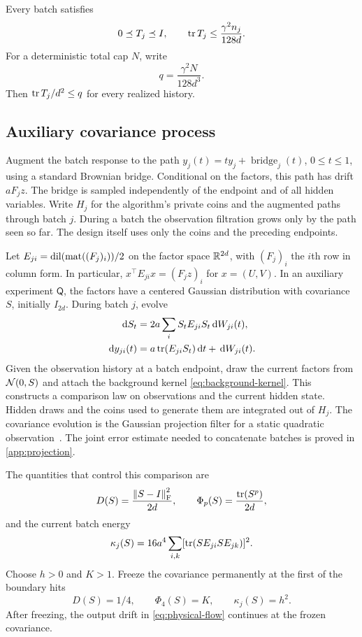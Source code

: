 Every batch satisfies
\begin{equation}
 0\preceq T_j\preceq I,\qquad
 \operatorname{tr} T_j\le\frac{\gamma^2n_j}{128d}.
 \label{eq:batch-energy}
\end{equation}
For a deterministic total cap $N$, write
\[
 q=\frac{\gamma^2N}{128d^3}.
\]
Then $\operatorname{tr} T_j/d^2\le q$ for every realized history.

\subsection{Auxiliary covariance process}

Augment the batch response to the path
$y_j(t)=t y_j+\operatorname{bridge}_j(t)$, $0\le t\le1$, using a standard Brownian bridge.
Conditional on the factors, this path has drift $aF_jz$.
The bridge is sampled independently of the endpoint and of all hidden variables. Write $H_j$ for the algorithm's private coins and the augmented paths through batch $j$. During a batch the observation filtration grows only by the path seen so far. The design itself uses only the coins and the preceding endpoints.

Let $E_{ji}=\operatorname{dil}(\operatorname{mat}((F_j)_i))/2$ on the factor space $\mathbb R^{2d}$, with $(F_j)_i$ the $i$th row in column form. In particular, $x^\top E_{ji}x=(F_j z)_i$ for $x=(U,V)$. In an auxiliary experiment
$\mathsf Q$, the factors have a centered Gaussian distribution with covariance $S$, initially $I_{2d}$. During batch $j$, evolve
\begin{align}
 \,\mathrm d S_t&=2a\sum_i S_tE_{ji}S_t\,\mathrm d W_{ji}(t),\notag\\
 \,\mathrm d y_{ji}(t)&=a\operatorname{tr}(E_{ji}S_t)\,\mathrm d t+\,\mathrm d W_{ji}(t).
 \label{eq:physical-flow}
\end{align}
Given the observation history at a batch endpoint, draw the current factors from $\mathcal N(0,S)$ and attach the background kernel \eqref{eq:background-kernel}. This constructs a comparison law on observations and the current hidden state. Hidden draws and the coins used to generate them are integrated out of $H_j$. The covariance evolution is the Gaussian projection filter for a static quadratic observation~\cite{brigo1999}. The joint error estimate needed to concatenate batches is proved in \cref{app:projection}.

The quantities that control this comparison are
\[
 D(S)=\frac{\left\lVert S-I\right\rVert_{\mathrm F}^2}{2d},
 \qquad \Phi_p(S)=\frac{\operatorname{tr}(S^p)}{2d},
\]
and the current batch energy
\[
 \kappa_j(S)=16a^4\sum_{i,k}
       [\operatorname{tr}(SE_{ji}SE_{jk})]^2.
\]
Choose $h>0$ and $K>1$. Freeze the covariance permanently at the first of the boundary hits
\[
 D(S)=1/4,\qquad \Phi_4(S)=K,\qquad \kappa_j(S)=h^2.
\]
After freezing, the output drift in \cref{eq:physical-flow} continues at the frozen covariance.

